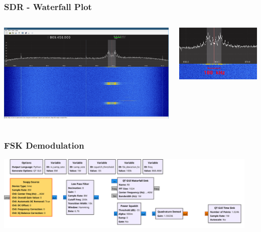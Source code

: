 \documentclass[aspectratio=169]{beamer}
\begin{document}
\begin{frame}
	\frametitle{SDR - Waterfall Plot}

	\begin{columns}
		\begin{column}{0.42\textwidth}
			\includegraphics[width=1.0\textwidth]{gqrx-waterfall.png}
		\end{column}
		\begin{column}{0.58\textwidth}
			\includegraphics[width=1.0\textwidth]{gqrx-waterfall-fsk-100khz.png}
		\end{column}
	\end{columns}
\end{frame}

\begin{frame}
	\frametitle{FSK Demodulation}

	\begin{center}
		\includegraphics[width=0.95\textwidth]{gnuradio-fsk-demodulation.pdf}
	\end{center}
\end{frame}
\end{document}
